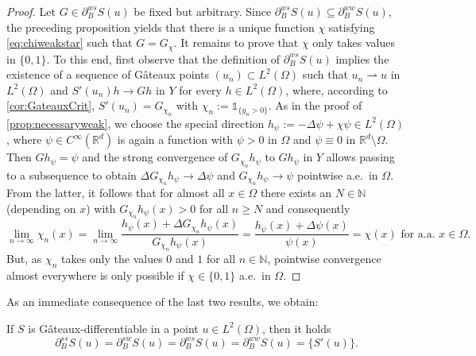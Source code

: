 \documentclass[reqno]{shinyart}
\begin{document}
\begin{proof} 
    Let $G \in  \partial_{B}^{ws} S(u)$ be fixed but arbitrary.
    Since $\partial_{B}^{ws} S(u) \subseteq \partial_{B}^{ww} S(u)$, the preceding proposition 
    yields that there is a unique function $\chi$ satisfying \eqref{eq:chiweakstar} such that 
    $G = G_\chi$. It remains to prove that $\chi$ only takes values in $\{0,1\}$. 
    To this end, first observe that the definition of $\partial_{B}^{ws} S(u)$ implies the 
    existence of a sequence of G\^ateaux points $(u_n)\subset L^2(\Omega)$ such that 
    $u_n {\rightharpoonup} u$ in $L^2(\Omega)$ and $S'(u_n) h \to G h$ in $Y$
    for every $h \in L^2(\Omega)$, where, according to 
    \cref{cor:GateauxCrit}, $S'(u_n) = G_{\chi_n}$ with $\chi_n := \mathbb{1}_{\{y_n >0\}}$.
    As in the proof of \cref{prop:necessaryweak}, we choose 
    the special direction $h_\psi := -\Delta \psi + \chi  \psi \in L^2(\Omega)$,
    where $\psi \in C^\infty({\mathbb{R}}^d)$ is again a function with $\psi > 0$ in $\Omega$ 
    and $\psi \equiv 0$ in ${\mathbb{R}}^d \setminus \Omega$.
    Then  $G h_\psi = \psi$ and the strong convergence of $G_{\chi_n} h_\psi$ to $G h_\psi$
    in $Y$ allows passing to a subsequence to obtain 
    $\Delta G_{\chi_n}h_\psi \to \Delta \psi$ and $G_{\chi_n} h_\psi \to \psi$ pointwise a.e.\ in $\Omega$. 
    From the latter, it follows that for almost all $x \in \Omega$ there exists an $N \in \mathbb{N}$
    (depending on $x$) with $G_{\chi_n}h_\psi(x) > 0$ for all $n \geq N$ and consequently
    \begin{equation*}
        \lim_{n \to \infty} \chi_n(x) 
        = \lim_{n \to \infty} \frac{h_\psi(x) + \Delta G_{\chi_n}h_\psi(x)}{G_{\chi_n}h_\psi(x)} 
        = \frac{h_\psi(x) + \Delta \psi(x)}{\psi(x)}  = \chi(x) \text{ for a.a.\ } x \in \Omega. 
    \end{equation*}
    But, as $\chi_n$ takes only the values $0$ and $1$ for all $n\in{\mathbb{N}}$, 
    pointwise convergence almost everywhere is only possible 
    if $\chi \in \{0, 1\}$ a.e.\ in $\Omega$.
\end{proof}

As an immediate consequence of the last two results, we obtain:

\begin{corollary}
    If $S$ is G\^ateaux-differentiable in a point $u \in L^2(\Omega)$, then it holds
    \begin{equation*}
        \partial_{B}^{ss} S(u) =\partial_{B}^{sw} S(u) = \partial_{B}^{ws} S(u)
        = \partial_{B}^{ww} S(u) = \{S'(u)\}. 
    \end{equation*}
\end{corollary}
\end{document}
